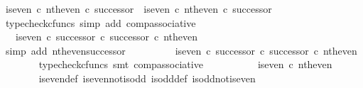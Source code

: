 \begin{isabellebody}
\ {\isachardoublequoteopen}{\isacharparenleft}{\kern0pt}is{\isacharunderscore}{\kern0pt}even\ {\isasymcirc}\isactrlsub c\ nth{\isacharunderscore}{\kern0pt}even{\isacharparenright}{\kern0pt}\ {\isasymcirc}\isactrlsub c\ successor\ {\isacharequal}{\kern0pt}\ is{\isacharunderscore}{\kern0pt}even\ {\isasymcirc}\isactrlsub c\ nth{\isacharunderscore}{\kern0pt}even\ {\isasymcirc}\isactrlsub c\ successor{\isachardoublequoteclose}\isanewline
\ \ \ \ \ \ \isamarkupfalse%
\ {\isacharparenleft}{\kern0pt}typecheck{\isacharunderscore}{\kern0pt}cfuncs{\isacharcomma}{\kern0pt}\ simp\ add{\isacharcolon}{\kern0pt}\ comp{\isacharunderscore}{\kern0pt}associative{}{\isacharparenright}{\kern0pt}\isanewline
\ \ \ \ \isamarkupfalse%
\ \isamarkupfalse%
\ {\isachardoublequoteopen}{\isachardot}{\kern0pt}{\isachardot}{\kern0pt}{\isachardot}{\kern0pt}\ {\isacharequal}{\kern0pt}\ is{\isacharunderscore}{\kern0pt}even\ {\isasymcirc}\isactrlsub c\ successor\ {\isasymcirc}\isactrlsub c\ successor\ {\isasymcirc}\isactrlsub c\ nth{\isacharunderscore}{\kern0pt}even{\isachardoublequoteclose}\isanewline
\ \ \ \ \ \ \isamarkupfalse%
\ {\isacharparenleft}{\kern0pt}simp\ add{\isacharcolon}{\kern0pt}\ nth{\isacharunderscore}{\kern0pt}even{\isacharunderscore}{\kern0pt}successor{}{\isacharparenright}{\kern0pt}\isanewline
\ \ \ \ \isamarkupfalse%
\ \isamarkupfalse%
\ {\isachardoublequoteopen}{\isachardot}{\kern0pt}{\isachardot}{\kern0pt}{\isachardot}{\kern0pt}\ {\isacharequal}{\kern0pt}\ {\isacharparenleft}{\kern0pt}{\isacharparenleft}{\kern0pt}is{\isacharunderscore}{\kern0pt}even\ {\isasymcirc}\isactrlsub c\ successor{\isacharparenright}{\kern0pt}\ {\isasymcirc}\isactrlsub c\ successor{\isacharparenright}{\kern0pt}\ {\isasymcirc}\isactrlsub c\ nth{\isacharunderscore}{\kern0pt}even{\isachardoublequoteclose}\isanewline
\ \ \ \ \ \ \isamarkupfalse%
\ {\isacharparenleft}{\kern0pt}typecheck{\isacharunderscore}{\kern0pt}cfuncs{\isacharcomma}{\kern0pt}\ smt\ comp{\isacharunderscore}{\kern0pt}associative{}{\isacharparenright}{\kern0pt}\isanewline
\ \ \ \ \isamarkupfalse%
\ \isamarkupfalse%
\ {\isachardoublequoteopen}{\isachardot}{\kern0pt}{\isachardot}{\kern0pt}{\isachardot}{\kern0pt}\ {\isacharequal}{\kern0pt}\ \ is{\isacharunderscore}{\kern0pt}even\ {\isasymcirc}\isactrlsub c\ nth{\isacharunderscore}{\kern0pt}even{\isachardoublequoteclose}\isanewline
\ \ \ \ \ \ \isamarkupfalse%
\ is{\isacharunderscore}{\kern0pt}even{\isacharunderscore}{\kern0pt}def{}\ is{\isacharunderscore}{\kern0pt}even{\isacharunderscore}{\kern0pt}not{\isacharunderscore}{\kern0pt}is{\isacharunderscore}{\kern0pt}odd\ is{\isacharunderscore}{\kern0pt}odd{\isacharunderscore}{\kern0pt}def{}\ is{\isacharunderscore}{\kern0pt}odd{\isacharunderscore}{\kern0pt}not{\isacharunderscore}{\kern0pt}is{\isacharunderscore}{\kern0pt}even\ \isamarkupfalse%

\end{isabellebody}
